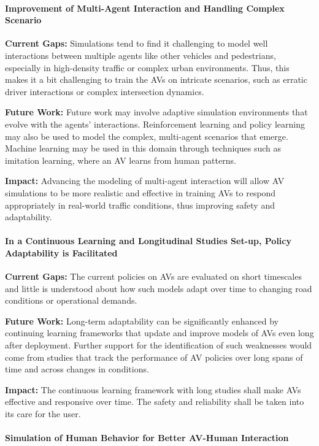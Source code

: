 \documentclass[lettersize,journal]{IEEEtran}
\begin{document}
\paragraph{Improvement of Multi-Agent Interaction and Handling Complex Scenario}

\textbf{Current Gaps:} Simulations tend to find it challenging to model well interactions between multiple agents like other vehicles and pedestrians, especially in high-density traffic or complex urban environments. Thus, this makes it a bit challenging to train the AVs on intricate scenarios, such as erratic driver interactions or complex intersection dynamics.

\textbf{Future Work:} Future work may involve adaptive simulation environments that evolve with the agents' interactions. Reinforcement learning and policy learning may also be used to model the complex, multi-agent scenarios that emerge. Machine learning may be used in this domain through techniques such as imitation learning, where an AV learns from human patterns.

\textbf{Impact:} Advancing the modeling of multi-agent interaction will allow AV simulations to be more realistic and effective in training AVs to respond appropriately in real-world traffic conditions, thus improving safety and adaptability.

\paragraph{In a Continuous Learning and Longitudinal Studies Set-up, Policy Adaptability is Facilitated}

\textbf{Current Gaps:} The current policies on AVs are evaluated on short timescales and little is understood about how such models adapt over time to changing road conditions or operational demands.

\textbf{Future Work:} Long-term adaptability can be significantly enhanced by continuing learning frameworks that update and improve models of AVs even long after deployment. Further support for the identification of such weaknesses would come from studies that track the performance of AV policies over long spans of time and across changes in conditions.

\textbf{Impact:} The continuous learning framework with long studies shall make AVs effective and responsive over time. The safety and reliability shall be taken into its care for the user.

\paragraph{Simulation of Human Behavior for Better AV-Human Interaction}
\end{document}
